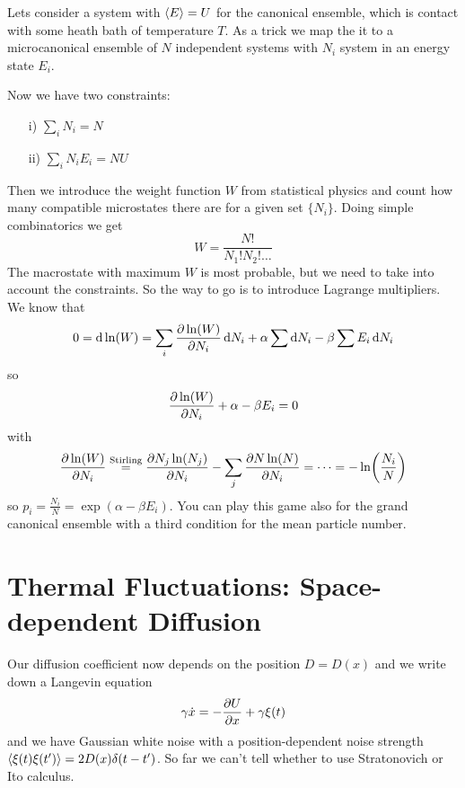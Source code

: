 \documentclass{/home/ben/Templates/notebook}
\begin{document}
	Lets consider a system with $\expval{E} = U$ for the canonical ensemble, which is contact with some heath bath of temperature $T$. As a trick we map the it to a microcanonical ensemble of $N$ independent systems with $N_i$ system in an energy state $E_i$. 
	
	Now we have two constraints:
	\begin{itemize}
		\item[i)]  $\sum_i N_i = N$
		\item[ii)] $\sum_i N_i E_i = N U$
	\end{itemize}
	
	Then we introduce the weight function $W$ from statistical physics and count how many compatible microstates there are for a given set $\{ N_i \}$. Doing simple combinatorics we get
	\begin{equation}
	W = \frac{N!}{N_1! N_2! \dots}
	\end{equation}
	The macrostate with maximum $W$ is most probable, but we need to take into account the constraints. So the way to go is to introduce Lagrange multipliers. We know that 
	\begin{equation}
	0 = \dd{\ln(W)} = \sum_i \pdv{\ln(W)}{N_i} \dd{N_i} + \alpha \sum \dd{N_i} - \beta \sum E_i \dd{N_i}
	\end{equation}
	so
	\begin{equation}
	\pdv{\ln(W)}{N_i} + \alpha - \beta E_i = 0
	\end{equation}
	with
	\begin{equation}
	\pdv{\ln(W)}{N_i} \overset{\mathrm{Stirling}}{=} \pdv{N_j \ln(N_j)}{N_i} - \sum_j \pdv{N \ln(N)}{N_i} = \dots = - \ln(\frac{N_i}{N})
	\end{equation}
	so $p_i = \frac{N_i}{N} = \exp(\alpha - \beta E_i)$. You can play this game also for the grand canonical ensemble with a third condition for the mean particle number.
	
	\section{Thermal Fluctuations: Space-dependent Diffusion}
	
	Our diffusion coefficient now depends on the position $D = D(x)$ and we write down a Langevin equation
	\begin{equation}
	\gamma \dot{x} = - \pdv{U}{x} + \gamma \xi(t)
	\end{equation}
	and we have Gaussian white noise with a position-dependent noise strength $\expval{\xi(t)\xi(t')} = 2 D(x) \delta(t-t')$. So far we can't tell whether to use Stratonovich or Ito calculus.
	
\end{document}
